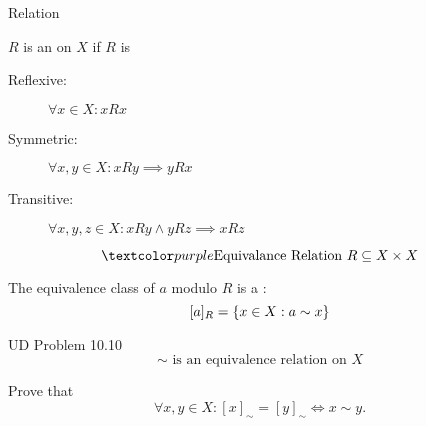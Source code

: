 
\begin{frame}{}
  \begin{center}
    {\LARGE Relation}
  \end{center}

\end{frame}

\begin{frame}{}
  \begin{definition}
    $R$ is an  on $X$ if $R$ is
    \begin{description}
      \item[Reflexive:] $\forall x \in X: x R x$ \vspace{-0.30cm}
      \item[Symmetric:] $\forall x, y \in X: x R y \implies y R x$
      \item[Transitive:] $\forall x, y, z \in X: x R y \land y R z \implies x R z$
    \end{description}
  \end{definition}
\end{frame}

\begin{frame}{}
  \begin{definition}
    \[
      \purple{\text{Equivalance Relation } R \subseteq X \times X}
    \]

    The equivalence class of $a$ modulo $R$ is a :
    \[
      [a]_{R} = \{x \in X: a \sim x\}
    \]
  \end{definition}
\end{frame}

\begin{frame}{}
  \begin{exampleblock}{UD Problem 10.10}
    \[
      \sim \text{ is an equivalence relation on } X
    \]

    Prove that 
    \[
      \forall x, y \in X: [x]_{\sim} = [y]_{\sim} \iff x \sim y.
    \]
  \end{exampleblock}
\end{frame}

